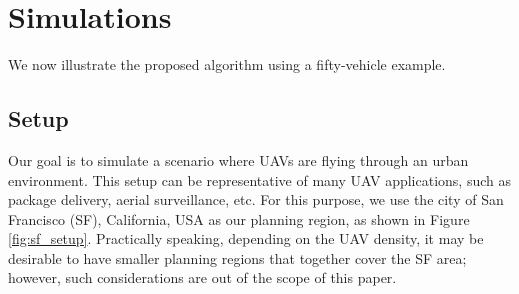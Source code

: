 \section{Simulations \label{sec:simulations}}
We now illustrate the proposed algorithm using a fifty-vehicle example. 

\subsection{Setup \label{sec:simSetup}}
Our goal is to simulate a scenario where UAVs are flying through an urban environment. This setup can be representative of many UAV applications, such as package delivery, aerial surveillance, etc. For this purpose, we use the city of San Francisco (SF), California, USA as our planning region, as shown in Figure \ref{fig:sf_setup}. Practically speaking, depending on the UAV density, it may be desirable to have smaller planning regions that together cover the SF area; however, such considerations are out of the scope of this paper.

